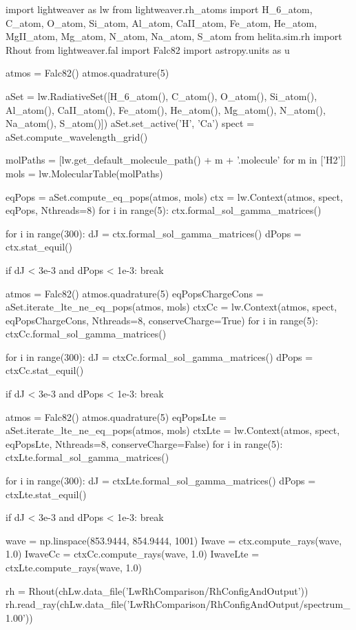 \begin{pycode}[Lw]
import lightweaver as lw
from lightweaver.rh_atoms import H_6_atom, C_atom, O_atom,  Si_atom, Al_atom, CaII_atom, Fe_atom, He_atom, MgII_atom, Mg_atom, N_atom, Na_atom, S_atom
from helita.sim.rh import Rhout
from lightweaver.fal import Falc82
import astropy.units as u

atmos = Falc82()
atmos.quadrature(5)

aSet = lw.RadiativeSet([H_6_atom(), C_atom(), O_atom(), Si_atom(), Al_atom(),
                        CaII_atom(), Fe_atom(), He_atom(), Mg_atom(), N_atom(),
                        Na_atom(), S_atom()])
aSet.set_active('H', 'Ca')
spect = aSet.compute_wavelength_grid()

molPaths = [lw.get_default_molecule_path() + m + '.molecule' for m in ['H2']]
mols = lw.MolecularTable(molPaths)

eqPops = aSet.compute_eq_pops(atmos, mols)
ctx = lw.Context(atmos, spect, eqPops, Nthreads=8)
for i in range(5):
    ctx.formal_sol_gamma_matrices()

for i in range(300):
    dJ = ctx.formal_sol_gamma_matrices()
    dPops = ctx.stat_equil()

    if dJ < 3e-3 and dPops < 1e-3:
        break

atmos = Falc82()
atmos.quadrature(5)
eqPopsChargeCons = aSet.iterate_lte_ne_eq_pops(atmos, mols)
ctxCc = lw.Context(atmos, spect, eqPopsChargeCons, Nthreads=8, conserveCharge=True)
for i in range(5):
    ctxCc.formal_sol_gamma_matrices()

for i in range(300):
    dJ = ctxCc.formal_sol_gamma_matrices()
    dPops = ctxCc.stat_equil()

    if dJ < 3e-3 and dPops < 1e-3:
        break

atmos = Falc82()
atmos.quadrature(5)
eqPopsLte = aSet.iterate_lte_ne_eq_pops(atmos, mols)
ctxLte = lw.Context(atmos, spect, eqPopsLte, Nthreads=8, conserveCharge=False)
for i in range(5):
    ctxLte.formal_sol_gamma_matrices()

for i in range(300):
    dJ = ctxLte.formal_sol_gamma_matrices()
    dPops = ctxLte.stat_equil()

    if dJ < 3e-3 and dPops < 1e-3:
        break

wave = np.linspace(853.9444, 854.9444, 1001)
Iwave = ctx.compute_rays(wave, 1.0)
IwaveCc = ctxCc.compute_rays(wave, 1.0)
IwaveLte = ctxLte.compute_rays(wave, 1.0)

rh = Rhout(chLw.data_file('LwRhComparison/RhConfigAndOutput'))
rh.read_ray(chLw.data_file('LwRhComparison/RhConfigAndOutput/spectrum_1.00'))


\end{pycode}
